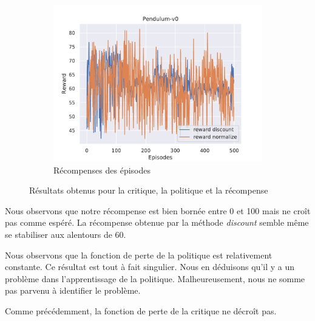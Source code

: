 \begin{figure}[H]
    \begin{subfigure}{0.3\textwidth}
        \includegraphics[width=\textwidth]{figures/iteration3/rewards_Pendulum-v0_pg_dataset_td_eval_True_cycles_500_trajs_20_batches_20_gamma_0.99_nstep_5_lr_ac.pdf}
        \caption{Récompenses des épisodes}
    \end{subfigure}
    \caption{Résultats obtenus pour la critique, la politique et la récompense}
    \label{fig:itr3_results}
\end{figure}

Nous observons que notre récompense est bien bornée entre 0 et 100 mais ne croît pas comme espéré. La récompense obtenue par la méthode \emph{discount} semble même se stabiliser aux alentours de 60.

Nous observons que la fonction de perte de la politique est relativement constante. Ce résultat est tout à fait singulier. Nous en déduisons qu'il y a un problème dans l'apprentissage de la politique. Malheureusement, nous ne somme pas parvenu à identifier le problème.

Comme précédemment, la fonction de perte de la critique ne décroît pas.

